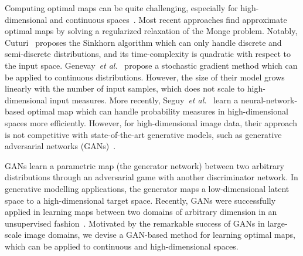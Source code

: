 \documentclass[runningheads]{llncs}
\newcommand\amjad[1]{\textcolor{blue}{Amjad: #1}}
\newcommand\mycitet[1]{\cite{#1}}
\begin{document}
Computing optimal maps can be quite challenging, especially for high-dimensional and continuous spaces~\citep{Peyre2018}.
Most recent approaches find approximate optimal maps by solving a regularized relaxation of the Monge problem. 
Notably, Cuturi~\mycitet{cuturi2013sinkhorn} proposes the Sinkhorn algorithm which can only handle discrete and semi-discrete distributions, and its time-complexity is quadratic with respect to the input space. Genevay~\emph{et al.}~\mycitet{Genevay2016} propose a stochastic gradient method which can be applied to continuous distributions. However, the size of their model grows linearly with the number of input samples, which does not scale to high-dimensional input measures.
More recently, Seguy~\emph{et al.}~\mycitet{Seguy2018LSOT} learn a neural-network-based optimal map which can handle probability measures in high-dimensional spaces more efficiently. However, for high-dimensional image data, their approach is not competitive with state-of-the-art generative models, such as generative adversarial networks (GANs)~\citep{goodfellow2014generative}.


GANs learn a parametric map (the generator network) between two arbitrary distributions through an adversarial game with another discriminator network. In generative modelling applications, the generator maps a low-dimensional latent space to a high-dimensional target space. Recently, GANs were successfully applied in learning maps between two domains of arbitrary dimension in an unsupervised fashion~\citep{zhu2017unpaired, almahairi2018augmented}.
Motivated by the remarkable success of GANs in large-scale image domains, we devise a GAN-based method for learning optimal maps, which can be applied to continuous and high-dimensional spaces.
\end{document}

